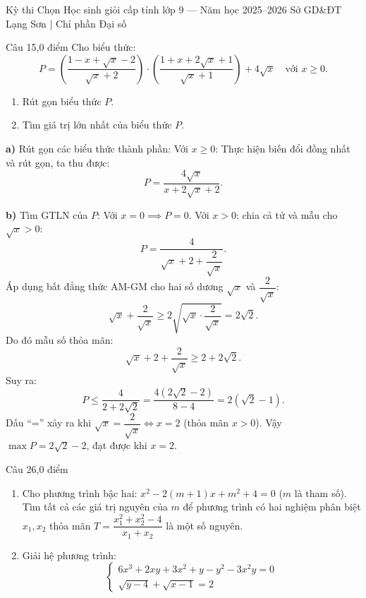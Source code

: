 ﻿%
%
  {Kỳ thi Chọn Học sinh giỏi cấp tỉnh lớp 9 — Năm học 2025--2026}%
  {Sở GD\&ĐT Lạng Sơn | Chỉ phần Đại số}

\begin{de_cau}{Câu 1}{5,0 điểm}
Cho biểu thức:
\[P = \left(\dfrac{1-x+\sqrt{x}-2}{\sqrt{x}+2}\right) \cdot \left(\dfrac{1+x+2\sqrt{x}+1}{\sqrt{x}+1}\right) + 4\sqrt{x} \quad \text{với } x \ge 0.\]
\begin{enumerate}[label=\alph*)]
\item Rút gọn biểu thức $P$.
\item Tìm giá trị lớn nhất của biểu thức $P$.
\end{enumerate}
\end{de_cau}

\begin{loi_giai_cau}
\textbf{a)} Rút gọn các biểu thức thành phần:
Với $x \ge 0$:
Thực hiện biến đổi đồng nhất và rút gọn, ta thu được:
\[P = \frac{4\sqrt{x}}{x + 2\sqrt{x} + 2}.\]

\textbf{b)} Tìm GTLN của $P$:
Với $x = 0 \implies P = 0$.
Với $x > 0$: chia cả tử và mẫu cho $\sqrt{x} > 0$:
\[P = \frac{4}{\sqrt{x} + 2 + \dfrac{2}{\sqrt{x}}}.\]
Áp dụng bất đẳng thức AM-GM cho hai số dương $\sqrt{x}$ và $\dfrac{2}{\sqrt{x}}$:
\[\sqrt{x} + \frac{2}{\sqrt{x}} \ge 2\sqrt{\sqrt{x} \cdot \frac{2}{\sqrt{x}}} = 2\sqrt{2}.\]
Do đó mẫu số thỏa mãn:
\[\sqrt{x} + 2 + \frac{2}{\sqrt{x}} \ge 2 + 2\sqrt{2}.\]
Suy ra:
\[P \le \frac{4}{2 + 2\sqrt{2}} = \frac{4(2\sqrt{2}-2)}{8-4} = 2(\sqrt{2}-1).\]
Dấu ``='' xảy ra khi $\sqrt{x} = \dfrac{2}{\sqrt{x}} \iff x = 2$ (thỏa mãn $x > 0$).
Vậy $\max P = \boxed{2\sqrt{2} - 2}$, đạt được khi $x = 2$.
\end{loi_giai_cau}

\begin{de_cau}{Câu 2}{6,0 điểm}
\begin{enumerate}[label=\alph*)]
\item Cho phương trình bậc hai: $x^2 - 2(m+1)x + m^2 + 4 = 0$ ($m$ là tham số). Tìm tất cả các giá trị nguyên của $m$ để phương trình có hai nghiệm phân biệt $x_1, x_2$ thỏa mãn $T = \dfrac{x_1^2 + x_2^2 - 4}{x_1 + x_2}$ là một số nguyên.
\item Giải hệ phương trình:
\[\begin{cases} 6x^3 + 2xy + 3x^2 + y - y^2 - 3x^2 y = 0 \\ \sqrt{y-4} + \sqrt{x-1} = 2 \end{cases}\]
\end{enumerate}
\end{de_cau}

